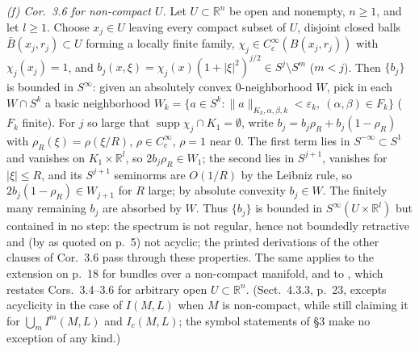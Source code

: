 \documentclass[11pt]{article}
\newcommand{\R}{\mathbb{R}}
\newcommand{\supp}{\operatorname{supp}}
\begin{document}
\emph{(f) Cor.~3.6 for non-compact $U$.} Let $U\subset\R^n$ be open and nonempty, $n\ge1$, and let $l\ge1$. Choose $x_j\in U$ leaving every compact subset of $U$, disjoint closed balls $\bar B(x_j,r_j)\subset U$ forming a locally finite family, $\chi_j\in C_c^\infty(B(x_j,r_j))$ with $\chi_j(x_j)=1$, and $b_j(x,\xi)=\chi_j(x)(1+|\xi|^2)^{j/2}\in S^j\setminus S^m$ ($m<j$). Then $\{b_j\}$ is bounded in $S^\infty$: given an absolutely convex $0$-neighborhood $W$, pick in each $W\cap S^k$ a basic neighborhood $W_k=\{a\in S^k:\|a\|_{K_k,\alpha,\beta,k}<\varepsilon_k,\ (\alpha,\beta)\in F_k\}$ ($F_k$ finite). For $j$ so large that $\supp\chi_j\cap K_1=\emptyset$, write $b_j=b_j\rho_R+b_j(1-\rho_R)$ with $\rho_R(\xi)=\rho(\xi/R)$, $\rho\in C_c^\infty$, $\rho=1$ near $0$. The first term lies in $S^{-\infty}\subset S^1$ and vanishes on $K_1\times\R^l$, so $2b_j\rho_R\in W_1$; the second lies in $S^{j+1}$, vanishes for $|\xi|\le R$, and its $S^{j+1}$ seminorms are $O(1/R)$ by the Leibniz rule, so $2b_j(1-\rho_R)\in W_{j+1}$ for $R$ large; by absolute convexity $b_j\in W$. The finitely many remaining $b_j$ are absorbed by $W$. Thus $\{b_j\}$ is bounded in $S^\infty(U\times\R^l)$ but contained in no step: the spectrum is not regular, hence not boundedly retractive and (by \cite[Cor.~6.5]{Wen03} as quoted on p.~5) not acyclic; the printed derivations of the other clauses of Cor.~3.6 pass through these properties. The same applies to the extension on p.~18 for bundles over a non-compact manifold, and to \cite[\S2.1.8, arXiv p.~15]{ALKL24m}, which restates Cors.~3.4--3.6 for arbitrary open $U\subset\R^n$. (Sect.~4.3.3, p.~23, excepts acyclicity in the case of $I(M,L)$ when $M$ is non-compact, while still claiming it for $\bigcup_mI^m(M,L)$ and $I_c(M,L)$; the symbol statements of \S3 make no exception of any kind.)
\end{document}
